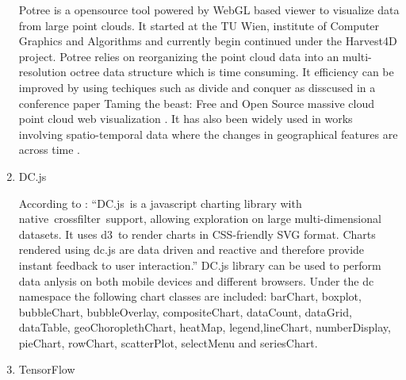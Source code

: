 \begin{enumerate}
Potree \label{\detokenize{i524/technologies:id152}}{\hyperref[\detokenize{i524/technologies:www-potree}]{\sphinxcrossref{{[}133{]}}}} is a opensource tool powered by WebGL
based viewer to visualize data from large point clouds. It started
at the TU Wien, institute of Computer Graphics and Algorithms and
currently begin continued under the Harvest4D project. Potree
relies on reorganizing the point cloud data into an
multi-resolution octree data structure which is time consuming. It
efficiency can be improved by using techiques such as divide and
conquer as disscused in a conference paper Taming the beast: Free
and Open Source massive cloud point cloud web
visualization \label{\detokenize{i524/technologies:id153}}{\hyperref[\detokenize{i524/technologies:potree-paper-1}]{\sphinxcrossref{{[}134{]}}}}. It has also been widely used
in works involving spatio-temporal data where the changes in
geographical features are across time \label{\detokenize{i524/technologies:id154}}{\hyperref[\detokenize{i524/technologies:potree-paper-2}]{\sphinxcrossref{{[}135{]}}}}.

\item {} 
DC.js

According to \label{\detokenize{i524/technologies:id155}}{\hyperref[\detokenize{i524/technologies:www-dcjs}]{\sphinxcrossref{{[}136{]}}}}: “DC.js is a javascript charting
library with native crossfilter support, allowing exploration on
large multi-dimensional datasets. It uses d3 to render charts in
CSS-friendly SVG format. Charts rendered using dc.js are data
driven and reactive and therefore provide instant feedback to user
interaction.” DC.js library can be used to perform data anlysis
on both mobile devices and different browsers. Under the dc
namespace the following chart classes are included: barChart,
boxplot, bubbleChart, bubbleOverlay, compositeChart, dataCount,
dataGrid, dataTable, geoChoroplethChart, heatMap,
legend,lineChart, numberDisplay, pieChart, rowChart, scatterPlot,
selectMenu and seriesChart.

\item {} 
TensorFlow


\end{enumerate}
